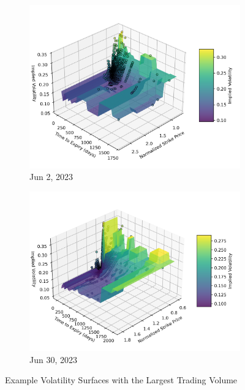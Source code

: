 \documentclass{article}
\begin{document}
\begin{figure}[!h]
    \begin{subfigure}{0.49\textwidth} %
        \centering
        \includegraphics[width=\linewidth]{img/vol_surface_20230602.png}
        \caption{Jun 2, 2023}
    \end{subfigure}
    \hfill
    \begin{subfigure}{0.49\textwidth} %
        \centering
        \includegraphics[width=\linewidth]{img/vol_surface_20230630.png}
        \caption{Jun 30, 2023}
    \end{subfigure}
    \caption{Example Volatility Surfaces with the Largest Trading Volume}
    \label{fig:vol_surface}
\end{figure}
\end{document}

